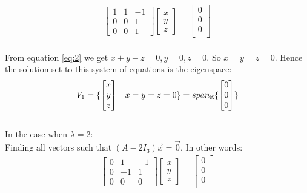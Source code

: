 \documentclass[reqno,a4paper,12pt]{amsart}
\newcommand{\R}{\mathbb{R}}
\begin{document}
  \begin{align}
    \begin{bmatrix}
       1  &  1  &  -1 \\
       0  &  0  &   1 \\ 
       0  &  0  &   1
    \end{bmatrix}
    \begin{bmatrix}
      x \\
      y \\
      z 
    \end{bmatrix}
    =
    \begin{bmatrix}
    0 \\
    0 \\
    0 \\
    \end{bmatrix} \label{eq:2}
  \end{align}\\
From equation \eqref{eq:2} we get $x+y-z=0, y=0, z=0$. So $x=y=z=0$. Hence the solution set to this system of equations is the eigenspace:\\ 
  \begin{align}
  V_1
  =
  \{
    \begin{bmatrix}
      x \\
      y \\
      z \\
    \end{bmatrix}
    |
    \hspace{0.2cm}x=y=z=0
  \}
  = 
  span_\R
  \{
  \begin{bmatrix}
  0 \\
  0 \\
  0 \\
  \end{bmatrix}
  \}\label{eq:3}
  \end{align}\\
In the case when $\lambda = 2$:\\
Finding all vectors such that $(A- 2I_{3}) \overrightarrow{x} = \overrightarrow{0}$. In other words:\\

  \begin{align}
    \begin{bmatrix}
       0  &  1  &  -1 \\
       0  & -1  &   1 \\ 
       0  &  0  &   0
    \end{bmatrix}
    \begin{bmatrix}
      x \\
      y \\
      z 
    \end{bmatrix}
    =
    \begin{bmatrix}
    0 \\
    0 \\
    0 \\
    \end{bmatrix}\label{eq:4}
  \end{align}\\
     
\end{document}
